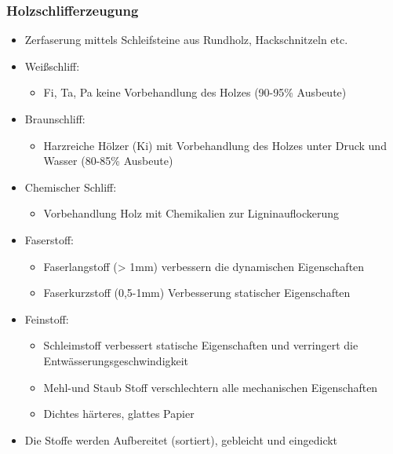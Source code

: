 \documentclass[12pt]{article}
\begin{document}
\subsubsection{Holzschlifferzeugung}
\begin{itemize}
  \item Zerfaserung mittels Schleifsteine aus Rundholz, Hackschnitzeln etc.
  \item Weißschliff:
  \begin{itemize}
    \item Fi, Ta, Pa keine Vorbehandlung des Holzes (90-95\% Ausbeute)
  \end{itemize}
  \item Braunschliff:
  \begin{itemize}
    \item Harzreiche Hölzer (Ki) mit Vorbehandlung des Holzes unter Druck und
    Wasser (80-85\% Ausbeute)
  \end{itemize}
  \item Chemischer Schliff:
  \begin{itemize}
    \item Vorbehandlung Holz mit Chemikalien zur Ligninauflockerung
  \end{itemize}
  \item Faserstoff:
  \begin{itemize}
    \item Faserlangstoff (> 1mm) verbessern die dynamischen Eigenschaften
    \item Faserkurzstoff (0,5-1mm) Verbesserung statischer Eigenschaften
  \end{itemize}
  \item Feinstoff:
  \begin{itemize}
    \item Schleimstoff verbessert statische Eigenschaften und verringert die
    Entwässerungsgeschwindigkeit
    \item Mehl-und Staub Stoff verschlechtern alle mechanischen Eigenschaften
    \item Dichtes härteres, glattes Papier 
  \end{itemize}
  \item Die Stoffe werden Aufbereitet (sortiert), gebleicht und eingedickt
\end{itemize}
\end{document}
